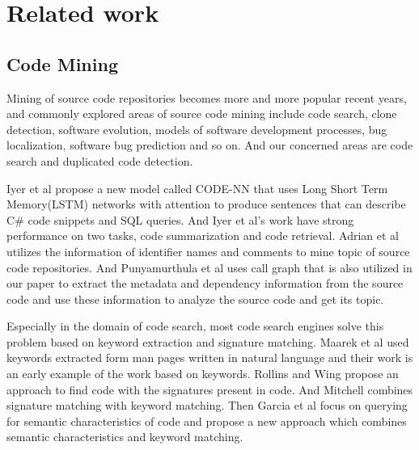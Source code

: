 \section{Related work}


\subsection{Code Mining}
Mining of source code repositories becomes more and more popular recent years, and commonly explored areas of source code mining include code search, clone detection, software evolution, models of software development processes, bug localization, software bug prediction and so on. And our concerned areas are code search and duplicated code detection.


Iyer et al \cite{iyer2016summarizing} propose a new model called CODE-NN that uses Long Short Term Memory(LSTM) networks with attention to produce sentences that can describe C\# code snippets and SQL queries. And Iyer et al's work have strong performance on two tasks, code summarization and code retrieval.
Adrian et al \cite{kuhn2007semantic} utilizes the information of identifier names and comments to mine topic of source code repositories. And Punyamurthula et al \cite{punyamurthula2015dynamic} uses call graph that is also utilized in our paper to extract the metadata and dependency information from the source code and use these information to analyze the source code and get its topic.

Especially in the domain of code search, most code search engines solve this problem based on keyword extraction and signature matching. Maarek et al \cite{maarek1991information} used keywords extracted form man pages written in natural language and their work is an early example of the work based on keywords. Rollins and Wing \cite{rollins1991specifications} propose an approach to find code with the signatures present in code. And Mitchell \cite{mitchell2008hoogle} combines signature matching with keyword matching. Then Garcia et al \cite{garcia2016semantic} focus on querying for semantic characteristics of code and propose a new approach which combines semantic characteristics and keyword matching.

